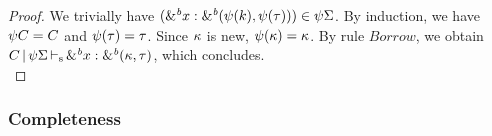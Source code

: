 \begin{theorem}
\begin{proof}


  We trivially have
  $({\&}^{\textit{b}}x : {\&}^{\textit{b}}(\mathrm{\psi}(k),\mathrm{\psi}(\tau))) \in \mathrm{\psi}\Sigma$.
  By induction, we have $\mathrm{\psi} C = C$ and $\mathrm{\psi}(\tau) = \tau$.
  Since $\kappa$ is new, $\mathrm{\psi}(\kappa) = \kappa$.
  By rule $Borrow$, we obtain
  $C \operatorname{|} \mathrm{\psi}\Sigma \operatorname{\vdash_s} {\&}^{\textit{b}}x : {\&}^{\textit{b}}(\kappa,\tau)$,
  which concludes.
  \\

  
\end{proof}
\end{theorem}


\subsubsection{Completeness}

